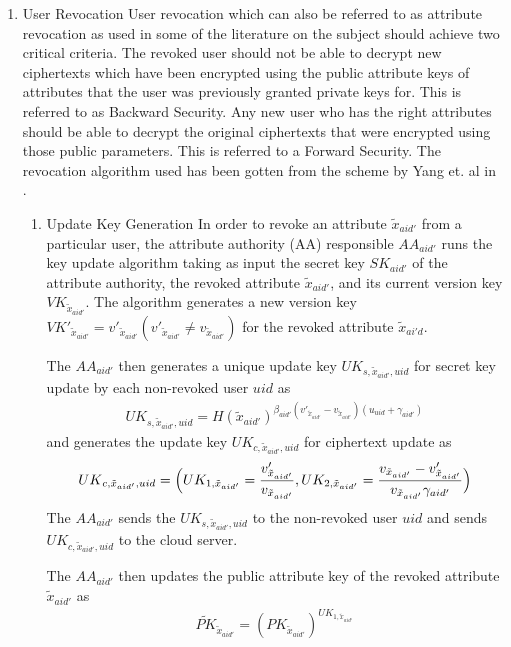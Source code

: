 \begin{enumerate}
	\item User Revocation
	User revocation which can also be referred to as attribute revocation as used in some of the literature on the subject should achieve two critical criteria. The revoked user should not be able to decrypt new ciphertexts which have been encrypted using the public attribute keys of attributes that the user was previously granted private keys for. This is referred to as Backward Security. Any new user who has the right attributes should be able to decrypt the original ciphertexts that were encrypted using those public parameters. This is referred to a Forward Security. The revocation algorithm used has been gotten from the scheme by Yang et. al in \cite{Yang2014}.
	
	
	\begin{enumerate}
		\item Update Key Generation
		In order to revoke an attribute $\tilde{x}_{aid'}$ from a particular user, the attribute authority (AA) responsible $AA_{aid'}$ runs the key update algorithm taking as input the secret key $SK_{aid'}$ of the 
		attribute authority, the revoked attribute $\tilde{x}_{aid'}$, and its current version key $VK_{\tilde{x}_{aid'}}$.
		The algorithm generates a new version key $VK'_{\tilde{x}_{aid'}} = v'_{\tilde{x}_{aid'}} (v'_{\tilde{x}_{aid'}} \neq v_{\tilde{x}_{aid'}})$ for the revoked attribute $\tilde{x}_{ai'd}$.
		
		The $AA_{aid'}$ then generates a unique update key ${UK}_{s,\tilde{x}_{aid'},uid}$ for secret key update by each non-revoked user $uid$ as
		\begin{align*}
			{UK}_{s,\tilde{x}_{aid'},uid} = H(\tilde{x}_{aid'})^{\beta_{aid'}(v'_{\tilde{x}_{aid'}}-v_{\tilde{x}_{aid'}})(u_{uid}+\gamma_{aid'})}
		\end{align*}
		and generates the update key ${UK}_{c,\tilde{x}_{aid'},uid}$ for ciphertext update as
		\begin{align*}
			{UK}_{c,\tilde{x}_{aid'},uid} =\Bigl( UK_{1,\tilde{x}_{aid'}} = \frac{v'_{\tilde{x}_{aid'}}}{v_{\tilde{x}_{aid'}}}, UK_{2,\tilde{x}_{aid'}} = \frac{v_{\tilde{x}_{aid'}} - v'_{\tilde{x}_{aid'}}}{v_{\tilde{x}_{aid'}}\gamma_{aid'}} \Bigl)
		\end{align*}
		The $AA_{aid'}$ sends the ${UK}_{s,\tilde{x}_{aid'},uid}$ to the non-revoked user $uid$ and sends ${UK}_{c,\tilde{x}_{aid'},uid}$ to the cloud server.
		
		The $AA_{aid'}$ then updates the public attribute key of the revoked attribute $\tilde{x}_{aid'}$ as
		\begin{align*}
			\widetilde{PK}_{\tilde{x}_{aid'}} = ({PK}_{\tilde{x}_{aid'}})^{UK_{1,\tilde{x}_{aid'}}}
		\end{align*}
		

\end{enumerate}
\end{enumerate}
